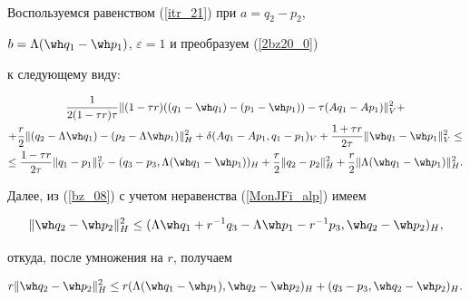 \begin{pf}
\begin{multline}
\label{2bz20_0}


\end{multline}





Воспользуемся равенством (\ref{itr_21}) при $a=q_2-p_2$, 


$b=\Lambda (\wh q_1-\wh p_1)$, $\varepsilon =1$ и преобразуем (\ref{2bz20_0})


к следующему виду:


\begin{multline}


\frac {1}{2 (1-\tau r) \tau} \| (1-\tau r) ((q_1 -\wh q_1)- (p_1- \wh p_1))


- \tau (A q_1- A p_1) \|_V^2+ \\


%


+\frac {r} {2} \| (q_2-\Lambda \wh q_1) -(p_2-\Lambda \wh p_1) \|_H^2+


\delta (A q_1-A p_1, q_1-p_1)_V +


\frac {1+\tau r} {2 \tau} \| {\wh q_1-\wh p_1} \|_V^2 \leq \\


%


\leq \frac {1-\tau r} {2 \tau} \| {q_1-p_1} \|_V^2 -


 ({q_3-p_3, \Lambda (\wh q_1-\wh p_1)})_H


+ \frac {r} {2} \| {q_2-p_2} \|_H^2+


 \frac {r} {2} \| {\Lambda (\wh q_1-\wh p_1)} \|_H^2.


\label{2bz20}


\end{multline}


Далее, из (\ref{bz_08}) с учетом неравенства (\ref{MonJFi_alp}) имеем


$$


\| {\wh q_2-\wh p_2} \|_H^2 \leq 


(\Lambda \wh q_1+r^{-1} q_3-\Lambda \wh p_1-r^{-1} p_3 , \wh q_2-\wh p_2)_H ,


$$


откуда, после умножения на $r$, получаем


\begin{equation}


r \| {\wh q_2-\wh p_2} \|_H^2 \leq 


r ({\Lambda (\wh q_1-\wh p_1) , \wh q_2-\wh p_2})_H 


+ ({q_3-p_3 , \wh q_2-\wh p_2})_H .



\end{equation}
\end{pf}
